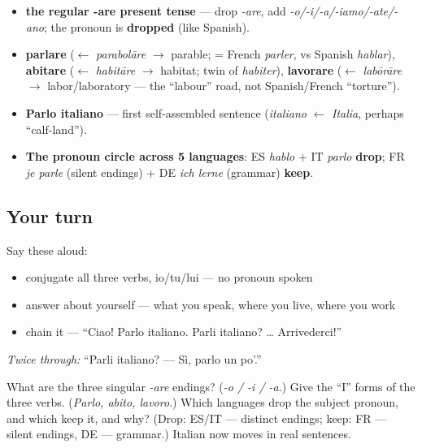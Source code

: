 \begin{grammarlens}[title={What you've built this chapter}]
\begin{itemize}
\raggedright
  \item \textbf{the regular -are present tense} — drop \emph{-are}, add \emph{-o/-i/-a/-iamo/-ate/-ano}; the pronoun is \textbf{dropped} (like Spanish).
  \item \textbf{parlare} ($\leftarrow$ \emph{parabolāre} $\to$ parable; = French \emph{parler}, vs Spanish \emph{hablar}), \textbf{abitare} ($\leftarrow$ \emph{habitāre} $\to$ habitat; twin of \emph{habiter}), \textbf{lavorare} ($\leftarrow$ \emph{labōrāre} $\to$ labor/laboratory — the \textquotedblleft{}labour\textquotedblright{} road, not Spanish/French \textquotedblleft{}torture\textquotedblright{}).
  \item \textbf{Parlo italiano} — first self-assembled sentence (\emph{italiano} $\leftarrow$ \emph{Italia}, perhaps \textquotedblleft{}calf-land\textquotedblright{}).
  \item \textbf{The pronoun circle across 5 languages}: ES \emph{hablo} + IT \emph{parlo} \textbf{drop}; FR \emph{je parle} (silent endings) + DE \emph{ich lerne} (grammar) \textbf{keep}.
\end{itemize}
\end{grammarlens}

\subsection*{Your turn}
Say these aloud:

\begin{itemize}
\raggedright
  \item conjugate all three verbs, io/tu/lui — no pronoun spoken
  \item answer about yourself — what you speak, where you live, where you work
  \item chain it — \textquotedblleft{}Ciao! Parlo italiano. Parli italiano? … Arrivederci!\textquotedblright{}
\end{itemize}

\emph{Twice through:} \textquotedblleft{}Parli italiano? — Sì, parlo un po'.\textquotedblright{}

\begin{tcolorbox}[breakable,colback=teal!4,colframe=teal!35!black,title={Before you move on}]
What are the three singular \emph{-are} endings? (\emph{-o / -i / -a}.) Give the \textquotedblleft{}I\textquotedblright{} forms of the three verbs. (\emph{Parlo, abito, lavoro}.) Which languages drop the subject pronoun, and which keep it, and why? (Drop: ES/IT — distinct endings; keep: FR — silent endings, DE — grammar.) Italian now moves in real sentences.
\end{tcolorbox}

